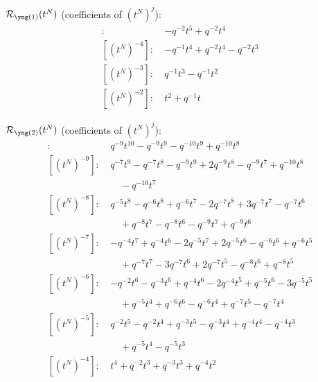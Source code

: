 $\Rred_{\yone}(t^N)$ (coefficients of $(t^N)^j$):
\begin{align*}
[(t^N)^{-5}]\colon\ & -q^{-2} t^{5} +q^{-2} t^{4} \\
[(t^N)^{-4}]\colon\ & -q^{-1} t^{4} +q^{-2} t^{4} -q^{-2} t^{3} \\
[(t^N)^{-3}]\colon\ & q^{-1} t^{3} -q^{-1} t^{2} \\
[(t^N)^{-2}]\colon\ & t^{2} +q^{-1} t
\end{align*}

$\Rred_{\ytwo}(t^N)$ (coefficients of $(t^N)^j$):
\begin{align*}
[(t^N)^{-10}]\colon\ & q^{-9} t^{10} -q^{-9} t^{9} -q^{-10} t^{9} +q^{-10} t^{8} \\
[(t^N)^{-9}]\colon\ & q^{-7} t^{9} -q^{-7} t^{8} -q^{-9} t^{9} +2 q^{-9} t^{8} -q^{-9} t^{7} +q^{-10} t^{8} \\
& \quad -q^{-10} t^{7} \\
[(t^N)^{-8}]\colon\ & q^{-5} t^{8} -q^{-6} t^{8} +q^{-6} t^{7} -2 q^{-7} t^{8} +3 q^{-7} t^{7} -q^{-7} t^{6} \\
& \quad +q^{-8} t^{7} -q^{-8} t^{6} -q^{-9} t^{7} +q^{-9} t^{6} \\
[(t^N)^{-7}]\colon\ & -q^{-4} t^{7} +q^{-4} t^{6} -2 q^{-5} t^{7} +2 q^{-5} t^{6} -q^{-6} t^{6} +q^{-6} t^{5} \\
& \quad +q^{-7} t^{7} -3 q^{-7} t^{6} +2 q^{-7} t^{5} -q^{-8} t^{6} +q^{-8} t^{5} \\
[(t^N)^{-6}]\colon\ & -q^{-2} t^{6} -q^{-3} t^{6} +q^{-4} t^{6} -2 q^{-4} t^{5} +q^{-5} t^{6} -3 q^{-5} t^{5} \\
& \quad +q^{-5} t^{4} +q^{-6} t^{6} -q^{-6} t^{4} +q^{-7} t^{5} -q^{-7} t^{4} \\
[(t^N)^{-5}]\colon\ & q^{-2} t^{5} -q^{-2} t^{4} +q^{-3} t^{5} -q^{-3} t^{4} +q^{-4} t^{4} -q^{-4} t^{3} \\
& \quad +q^{-5} t^{4} -q^{-5} t^{3} \\
[(t^N)^{-4}]\colon\ & t^{4} +q^{-2} t^{3} +q^{-3} t^{3} +q^{-4} t^{2}
\end{align*}

